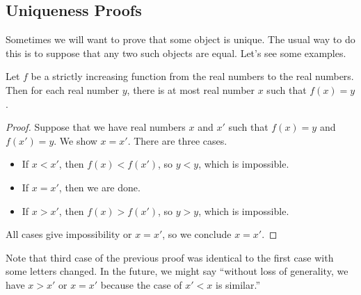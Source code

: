 \documentclass[../notes.tex]{subfiles}
\begin{document}
\subsection{Uniqueness Proofs}
Sometimes we will want to prove that some object is unique. The usual way to do this is to suppose that any two such objects are equal. Let's see some examples.
\begin{example} \label{exe:increasing-is-injective}
    Let $f$ be a strictly increasing function from the real numbers to the real numbers. Then for each real number $y$, there is at most real number $x$ such that $f(x)=y$.
\end{example}
\begin{proof}
    Suppose that we have real numbers $x$ and $x'$ such that $f(x)=y$ and $f(x')=y$. We show $x=x'$. There are three cases.
    \begin{itemize}
        \item If $x<x'$, then $f(x)<f(x')$, so $y<y$, which is impossible.
        \item If $x=x'$, then we are done.
        \item If $x>x'$, then $f(x)>f(x')$, so $y>y$, which is impossible.
    \end{itemize}
    All cases give impossibility or $x=x'$, so we conclude $x=x'$.
\end{proof}
Note that third case of the previous proof was identical to the first case with some letters changed. In the future, we might say ``without loss of generality, we have $x>x'$ or $x=x'$ because the case of $x'<x$ is similar.''
\end{document}
